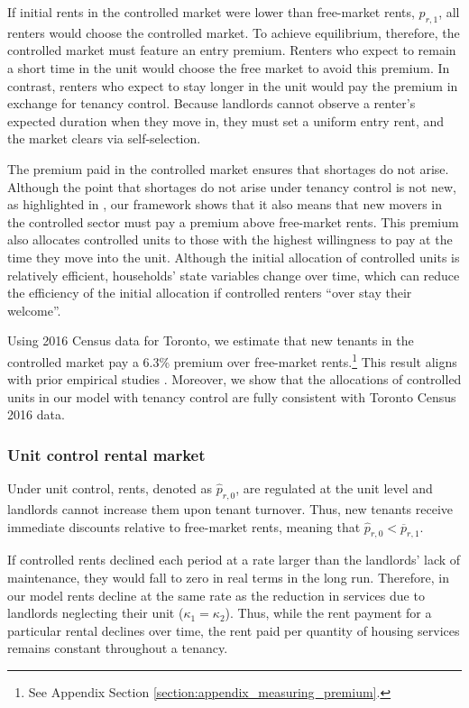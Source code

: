 \documentclass[parskip=full]{article}
\begin{document}
If initial rents in the controlled market were lower than free-market rents, $p_{r,1}$, all renters would choose the controlled market. To achieve equilibrium, therefore, the controlled market must feature an entry premium. Renters who expect to remain a short time in the unit would choose the free market to avoid this premium. In contrast, renters who expect to stay longer in the unit would pay the premium in exchange for tenancy control. Because landlords cannot observe a renter's expected duration when they move in, they must set a uniform entry rent, and the market clears via self-selection.

The premium paid in the controlled market ensures that shortages do not arise. Although the point that shortages do not arise under tenancy control is not new, as highlighted in \citet{arnott-1995}, our framework shows that it also means that new movers in the controlled sector must pay a premium above free-market rents. This premium also allocates controlled units to those with the highest willingness to pay at the time they move into the unit. Although the initial allocation of controlled units is relatively efficient, households' state variables change over time, which can reduce the efficiency of the initial allocation if controlled renters ``over stay their welcome''. 

Using 2016 Census data for Toronto, we estimate that new tenants in the controlled market pay a 6.3\% premium over free-market rents.\footnote{See Appendix Section \ref{section:appendix_measuring_premium}.} This result aligns with prior empirical studies \citep{nagy-1997,early-2000,cjq-2023}. Moreover, we show that the allocations of controlled units in our model with tenancy control are fully consistent with Toronto Census 2016 data.

\subsubsection{Unit control rental market}

Under unit control, rents, denoted as $\hat{p}_{r,0}$, are regulated at the unit level and landlords cannot increase them upon tenant turnover. Thus, new tenants receive immediate discounts relative to free-market rents, meaning that $\hat{p}_{r,0}<\overline{p}_{r,1}$. 

If controlled rents declined each period at a rate larger than the landlords' lack of maintenance, they would fall to zero in real terms in the long run. Therefore, in our model rents decline at the same rate as the reduction in services due to landlords neglecting their unit ($\kappa_1=\kappa_2$). Thus, while the rent payment for a particular rental declines over time, the rent paid per quantity of housing services remains constant throughout a tenancy. 
\end{document}
